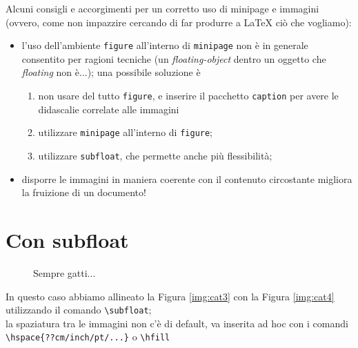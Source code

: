 \documentclass{article}
\begin{document}
\vspace{.5cm}
\noindent
Alcuni consigli e accorgimenti per un corretto uso di minipage e immagini (ovvero, come non impazzire cercando di far produrre a LaTeX ciò che vogliamo):
\begin{itemize}
	\item l'uso dell'ambiente \verb|figure| all'interno di \verb|minipage| non è in generale consentito per ragioni tecniche (un \emph{floating-object} dentro un oggetto che \emph{floating} non è...); una possibile soluzione è
	\begin{enumerate}
		\item non usare del tutto \verb|figure|, e inserire il pacchetto \verb|caption| per avere le didascalie correlate alle immagini
		\item utilizzare \verb|minipage| all'interno di \verb|figure|;
		\item utilizzare \verb|subfloat|, che permette anche più flessibilità;
	\end{enumerate}
	\item disporre le immagini in maniera coerente con il contenuto circostante migliora la fruizione di un documento!
\end{itemize}

\section{Con subfloat}
\begin{figure}[h]
	\centering
	\hfill
	\caption{Sempre gatti...}
\end{figure}
\noindent
In questo caso abbiamo allineato la Figura \ref{img:cat3} con la Figura \ref{img:cat4} utilizzando il comando \verb|\subfloat|;\\ la spaziatura tra le immagini non c'è di default, va inserita ad hoc con i comandi \verb|\hspace{??cm/inch/pt/...}| o \verb|\hfill|
\end{document}

